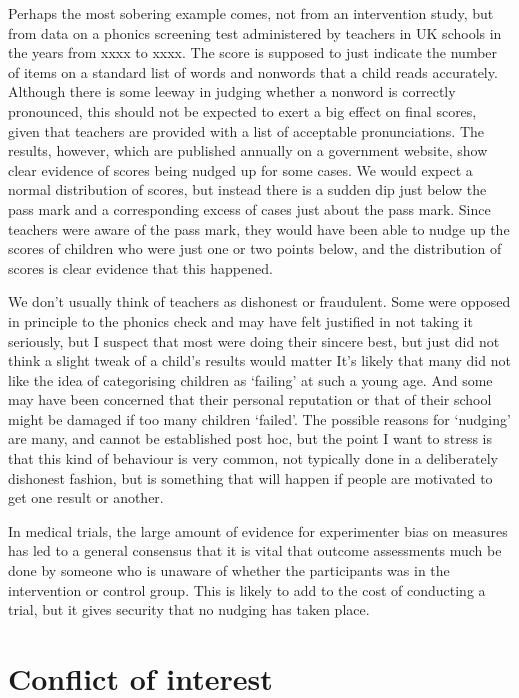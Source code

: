\documentclass[]{book}
\begin{document}
Perhaps the most sobering example comes, not from an intervention study, but from data on a phonics screening test administered by teachers in UK schools in the years from xxxx to xxxx. The score is supposed to just indicate the number of items on a standard list of words and nonwords that a child reads accurately. Although there is some leeway in judging whether a nonword is correctly pronounced, this should not be expected to exert a big effect on final scores, given that teachers are provided with a list of acceptable pronunciations. The results, however, which are published annually on a government website, show clear evidence of scores being nudged up for some cases. We would expect a normal distribution of scores, but instead there is a sudden dip just below the pass mark and a corresponding excess of cases just about the pass mark. Since teachers were aware of the pass mark, they would have been able to nudge up the scores of children who were just one or two points below, and the distribution of scores is clear evidence that this happened.

We don't usually think of teachers as dishonest or fraudulent. Some were opposed in principle to the phonics check and may have felt justified in not taking it seriously, but I suspect that most were doing their sincere best, but just did not think a slight tweak of a child's results would matter It's likely that many did not like the idea of categorising children as `failing' at such a young age. And some may have been concerned that their personal reputation or that of their school might be damaged if too many children `failed'. The possible reasons for `nudging' are many, and cannot be established post hoc, but the point I want to stress is that this kind of behaviour is very common, not typically done in a deliberately dishonest fashion, but is something that will happen if people are motivated to get one result or another.

In medical trials, the large amount of evidence for experimenter bias on measures has led to a general consensus that it is vital that outcome assessments much be done by someone who is unaware of whether the participants was in the intervention or control group. This is likely to add to the cost of conducting a trial, but it gives security that no nudging has taken place.

\hypertarget{conflict-of-interest}{%
\section{Conflict of interest}\label{conflict-of-interest}}
\end{document}
